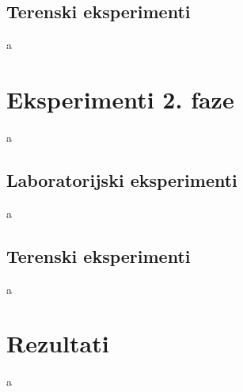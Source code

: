 \subsection{Terenski eksperimenti}
a

\section{Eksperimenti 2. faze}
a

\subsection{Laboratorijski eksperimenti}
a

\subsection{Terenski eksperimenti}
a

\section{Rezultati}
a

